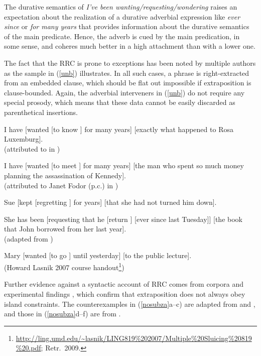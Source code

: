 \documentclass[output=paper
 	        ,biblatex
                ,babelshorthands
                ,newtxmath
                ,draftmode
                ,colorlinks, citecolor=brown
]{langscibook}
\begin{document}
\noindent
The  durative semantics  of   \emph{I've been wanting/requesting/wondering} 
 raises an expectation about the realization of   a durative  
adverbial expression like  \emph{ever since} or \emph{for many years} that
provides information about the durative semantics of the main predicate.
Hence, the adverb is cued by the main predication, in some sense, and 
  coheres much better in a high attachment than with a lower one.

The fact that the RRC is prone to exceptions has been noted by multiple authors as the sample in 
 (\ref{unb}) illustrates. In all such cases, a phrase is right-extracted
 from an embedded clause, which should be flat out impossible if extraposition is clause-bounded. Again, the adverbial  interveners in (\ref{unb}) do not require any special prosody, which means that
  these data cannot be easily discarded as parenthetical insertions.
  
\eal \label{unb}
\ex I have  [wanted [to know \spc] for many years] [exactly what happened to Rosa Luxemburg].\\
(attributed to \citealt{
witten} in \citealt[92n]{postal74})

\ex I have  [wanted [to meet \spc] for many years] [the man who spent so much money planning the assassination of Kennedy].\\
(attributed to Janet Fodor (p.c.) in \citealt[177]{gazdar})

\ex Sue [kept [regretting \spc] for years] [that she had not turned
him down].\\
\citep{eynde96}

\ex She has been [requesting that he [return \spc] [ever since last Tuesday]] [the book
that John borrowed from her last year].\\
(adapted from \citealp[167]{Kayne98a-u})

\ex  Mary [wanted [to go \spc] until yesterday]  [to the public lecture].\\
(Howard Lasnik 2007 course handout\footnote{\url{http://ling.umd.edu/~lasnik/LING819\%202007/Multiple\%20Sluicing\%20819\%20.pdf}; Retr.\ 2009.})
\zl



Further evidence against a syntactic account of RRC comes from  corpora 
\citep{Mueller2004d,Mueller2007c} and experimental findings  \citep{SS2009a-u,strunk}, which confirm
 that  extraposition does  not always obey  island constraints.  The counterexamples in (\ref{nosubza}a--c) are adapted from
 \citet{SS2009a-u} and \citet{strunk}, and those in (\ref{nosubza}d--f) are from \citet[863]{chavesrnr}.
\end{document}
